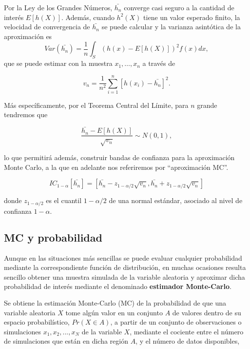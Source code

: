 \documentclass[
]{book}
\theoremstyle{definition}
\theoremstyle{definition}
\theoremstyle{definition}
\theoremstyle{definition}
\theoremstyle{remark}
\begin{document}
Por la Ley de los Grandes Números, \(\bar{h_n}\) converge casi seguro a la cantidad de interés \(E[h(X)]\). Además, cuando \(h^2(X)\) tiene un valor esperado finito, la velocidad de convergencia de \(\bar{h_n}\) se puede calcular y la varianza asintótica de la aproximación es \[Var(\bar{h_n})=\frac{1}{n} \int_S (h(x)-E[h(X)])^2 f(x) dx,\] que se puede estimar con la muestra \(x_1,\ldots,x_n\) a través de

\begin{equation}
v_n=\frac{1}{n^2} \sum_{i=1}^n [h(x_i)-\bar{h_n}]^2.
\label{eq:varianzaMC}
\end{equation}

Más específicamente, por el Teorema Central del Límite, para \(n\) grande tendremos que

\begin{equation}
\frac{\bar{h_n}-E[h(X)]}{\sqrt{v_n}} \sim N(0,1),
\label{eq:distMC}
\end{equation}

lo que permitirá además, construir bandas de confianza para la aproximación Monte Carlo, a la que en adelante nos referiremos por ``aproximación MC''.

\begin{equation}
IC_{1-\alpha}[\bar{h_n}]=[\bar{h_n}-z_{1-\alpha/2} \sqrt{v_n}, \bar{h_n}+z_{1-\alpha/2} \sqrt{v_n}]
\label{eq:icMC}
\end{equation}

donde \(z_{1-\alpha/2}\) es el cuantil \(1-\alpha/2\) de una normal estándar, asociado al nivel de confianza \(1-\alpha\).

\hypertarget{mc-y-probabilidad}{%
\subsection{MC y probabilidad}\label{mc-y-probabilidad}}

Aunque en las situaciones más sencillas se puede evaluar cualquier probabilidad mediante la correspondiente función de distribución, en muchas ocasiones resulta sencillo obtener una muestra simulada de la variable aleatoria y aproximar dicha probabilidad de interés mediante el denominado \textbf{estimador Monte-Carlo}.

Se obtiene la estimación Monte-Carlo (MC) de la probabilidad de que una variable aleatoria \(X\) tome algún valor en un conjunto \(A\) de valores dentro de su espacio probabilístico, \(Pr(X \in A)\), a partir de un conjunto de observaciones o simulaciones \(x_1, x_2,...,x_N\) de la variable \(X\), mediante el cociente entre el número de simulaciones que están en dicha región \(A\), y el número de datos disponibles,
\end{document}
